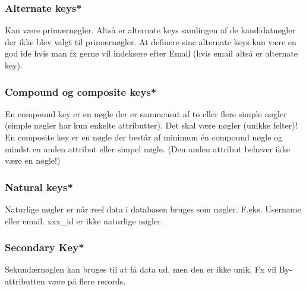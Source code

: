 \subsubsection{Alternate keys*}
Kan være primærnøgler. Altså er alternate keys samlingen af de kandidatnøgler der ikke blev valgt til primærnøgler. At definere sine alternate keys kan være en god ide hvis man fx gerne vil indeksere efter Email (hvis email altså er alternate key).

\subsubsection{Compound og composite keys*}
En compound key er en nøgle der er sammensat af to eller flere simple nøgler (simple nøgler har kun enkelte attributter). Det skal være nøgler (unikke felter)!
En composite key er en nøgle der består af minimum én compound nøgle og mindst en anden attribut eller simpel nøgle. (Den anden attribut behøver ikke være en nøgle!)

\subsubsection{Natural keys*}
Naturlige nøgler er når reel data i databasen bruges som nøgler. F.eks. Username eller email. xxx\_id er ikke naturlige nøgler.

\subsubsection{Secondary Key*}
Sekundærnøglen kan bruges til at få data ud, men den er ikke unik. Fx vil By-attributten være på flere records.